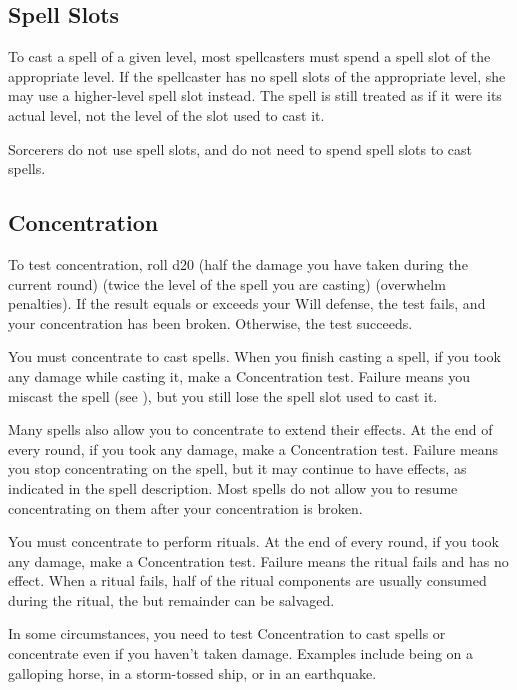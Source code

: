 \subsection{Spell Slots}
To cast a spell of a given level, most spellcasters must spend a spell slot of the appropriate level. If the spellcaster has no spell slots of the appropriate level, she may use a higher-level spell slot instead. The spell is still treated as if it were its actual level, not the level of the slot used to cast it.

Sorcerers do not use spell slots, and do not need to spend spell slots to cast spells.

\subsection{Concentration}\label{Concentration}

\label{Concentration Tests} To test concentration, roll d20 \add (half the damage you have taken during the current round) \add (twice the level of the spell you are casting) \add (overwhelm penalties). If the result equals or exceeds your Will defense, the test fails, and your concentration has been broken. Otherwise, the test succeeds.

 You must concentrate to cast spells. When you finish casting a spell, if you took any damage while casting it, make a Concentration test. Failure means you miscast the spell (see ), but you still lose the spell slot used to cast it.

 Many spells also allow you to concentrate to extend their effects. At the end of every round, if you took any damage, make a Concentration test. Failure means you stop concentrating on the spell, but it may continue to have effects, as indicated in the spell description. Most spells do not allow you to resume concentrating on them after your concentration is broken.

 You must concentrate to perform rituals. At the end of every round, if you took any damage, make a Concentration test. Failure means the ritual fails and has no effect. When a ritual fails, half of the ritual components are usually consumed during the ritual, the but remainder can be salvaged.

 In some circumstances, you need to test Concentration to cast spells or concentrate even if you haven't taken damage. Examples include being on a galloping horse, in a storm-tossed ship, or in an earthquake.

